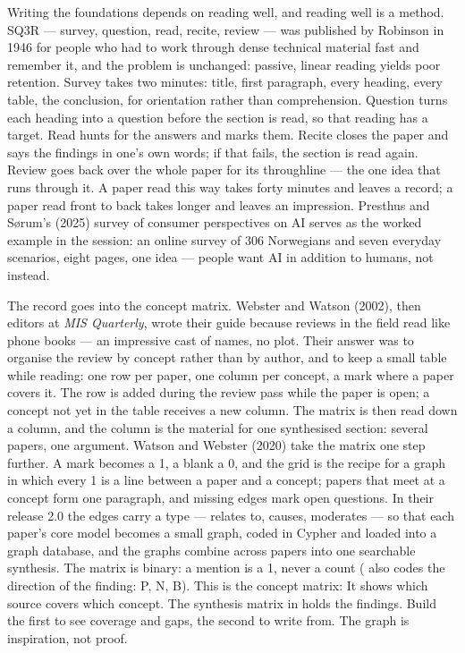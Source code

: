 \documentclass[11pt,a4paper,british,twoside=false,headings=small,chapterprefix=false,numbers=noenddot]{scrbook}
\begin{document}
Writing the foundations depends on reading well, and reading well is a method. SQ3R --- survey, question, read, recite, review --- was published by Robinson in 1946 for people who had to work through dense technical material fast and remember it, and the problem is unchanged: passive, linear reading yields poor retention. Survey takes two minutes: title, first paragraph, every heading, every table, the conclusion, for orientation rather than comprehension. Question turns each heading into a question before the section is read, so that reading has a target. Read hunts for the answers and marks them. Recite closes the paper and says the findings in one's own words; if that fails, the section is read again. Review goes back over the whole paper for its throughline --- the one idea that runs through it. A paper read this way takes forty minutes and leaves a record; a paper read front to back takes longer and leaves an impression. Presthus and Sørum's (2025) survey of consumer perspectives on AI serves as the worked example in the session: an online survey of 306 Norwegians and seven everyday scenarios, eight pages, one idea --- people want AI in addition to humans, not instead.

The record goes into the concept matrix. Webster and Watson (2002), then editors at \emph{MIS Quarterly}, wrote their guide because reviews in the field read like phone books --- an impressive cast of names, no plot. Their answer was to organise the review by concept rather than by author, and to keep a small table while reading: one row per paper, one column per concept, a mark where a paper covers it. The row is added during the review pass while the paper is open; a concept not yet in the table receives a new column. The matrix is then read down a column, and the column is the material for one synthesised section: several papers, one argument. Watson and Webster (2020) take the matrix one step further. A mark becomes a 1, a blank a 0, and the grid is the recipe for a graph in which every 1 is a line between a paper and a concept; papers that meet at a concept form one paragraph, and missing edges mark open questions. In their release 2.0 the edges carry a type --- relates to, causes, moderates --- so that each paper's core model becomes a small graph, coded in Cypher and loaded into a graph database, and the graphs combine across papers into one searchable synthesis. The matrix is binary: a mention is a 1, never a count ( also codes the direction of the finding: P, N, B). This is the concept matrix: It shows which source covers which concept. The synthesis matrix in  holds the findings. Build the first to see coverage and gaps, the second to write from. The graph is inspiration, not proof.
\end{document}
